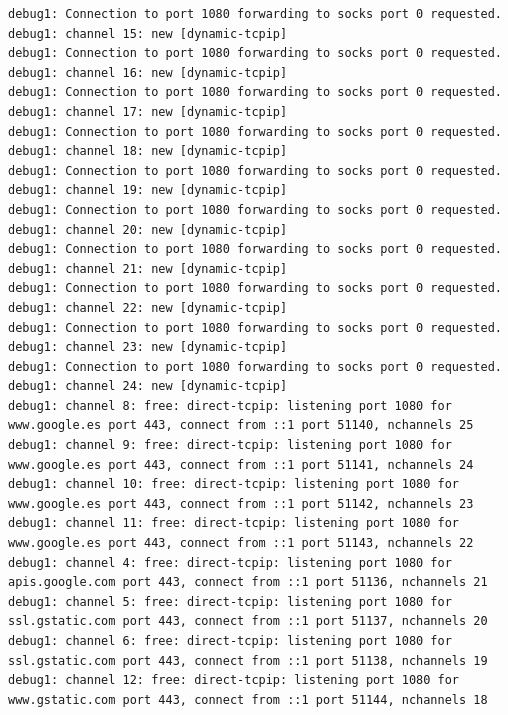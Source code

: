 \documentclass[11pt]{article}
\begin{document}
\begin{lstlisting}
debug1: Connection to port 1080 forwarding to socks port 0 requested.
debug1: channel 15: new [dynamic-tcpip]
debug1: Connection to port 1080 forwarding to socks port 0 requested.
debug1: channel 16: new [dynamic-tcpip]
debug1: Connection to port 1080 forwarding to socks port 0 requested.
debug1: channel 17: new [dynamic-tcpip]
debug1: Connection to port 1080 forwarding to socks port 0 requested.
debug1: channel 18: new [dynamic-tcpip]
debug1: Connection to port 1080 forwarding to socks port 0 requested.
debug1: channel 19: new [dynamic-tcpip]
debug1: Connection to port 1080 forwarding to socks port 0 requested.
debug1: channel 20: new [dynamic-tcpip]
debug1: Connection to port 1080 forwarding to socks port 0 requested.
debug1: channel 21: new [dynamic-tcpip]
debug1: Connection to port 1080 forwarding to socks port 0 requested.
debug1: channel 22: new [dynamic-tcpip]
debug1: Connection to port 1080 forwarding to socks port 0 requested.
debug1: channel 23: new [dynamic-tcpip]
debug1: Connection to port 1080 forwarding to socks port 0 requested.
debug1: channel 24: new [dynamic-tcpip]
debug1: channel 8: free: direct-tcpip: listening port 1080 for www.google.es port 443, connect from ::1 port 51140, nchannels 25
debug1: channel 9: free: direct-tcpip: listening port 1080 for www.google.es port 443, connect from ::1 port 51141, nchannels 24
debug1: channel 10: free: direct-tcpip: listening port 1080 for www.google.es port 443, connect from ::1 port 51142, nchannels 23
debug1: channel 11: free: direct-tcpip: listening port 1080 for www.google.es port 443, connect from ::1 port 51143, nchannels 22
debug1: channel 4: free: direct-tcpip: listening port 1080 for apis.google.com port 443, connect from ::1 port 51136, nchannels 21
debug1: channel 5: free: direct-tcpip: listening port 1080 for ssl.gstatic.com port 443, connect from ::1 port 51137, nchannels 20
debug1: channel 6: free: direct-tcpip: listening port 1080 for ssl.gstatic.com port 443, connect from ::1 port 51138, nchannels 19
debug1: channel 12: free: direct-tcpip: listening port 1080 for www.gstatic.com port 443, connect from ::1 port 51144, nchannels 18
\end{lstlisting}
\end{document}
